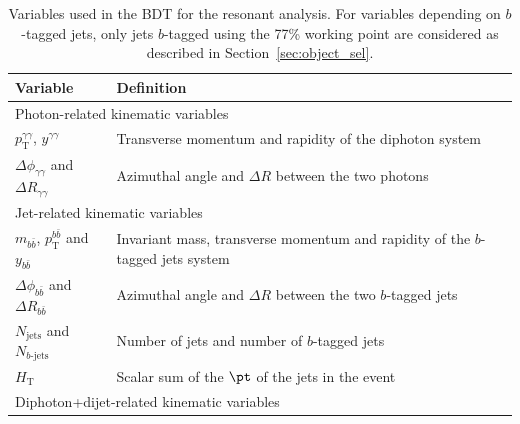 \documentclass[PAPER, cernpreprint, texlive=2016, paper=a4, USenglish, texmf]{atlasdoc}
\begin{document}
\begin{table}[!htb]
\centering
\renewcommand{\arraystretch}{.8}
\caption{Variables used in the BDT for the resonant analysis.
For variables depending on $b$-tagged jets, only jets $b$-tagged using the 77\% working point are considered as described in Section~\ref{sec:object_sel}.   \label{tab:BDT_Res_input}}
\begin{tabular}{ll}
\toprule
\midrule
Variable & Definition  \\
\midrule
\midrule
\multicolumn{2}{l}{Photon-related kinematic variables} \\
\midrule
$p_{\mathrm{T}}^{\gamma \gamma}$, $y^{\gamma \gamma}$  & \begin{minipage}[l]{0.55\textwidth} Transverse momentum and rapidity of the diphoton system  \end{minipage} \\[2ex]
$\Delta \phi_{\gamma \gamma}$ and $\Delta R_{\gamma \gamma}$  & \begin{minipage}[l]{0.55\textwidth} Azimuthal angle and $\Delta R$ between the two photons  \end{minipage} \\[2ex]
\midrule
\midrule
\multicolumn{2}{l}{Jet-related kinematic variables} \\
\midrule
$m_{b \bar{b}}$, $p_{\mathrm{T}}^{b \bar{b}}$ and $y_{b \bar{b}}$  & \begin{minipage}[l]{0.55\textwidth} Invariant mass, transverse momentum and rapidity of the $b$-tagged jets system  \end{minipage} \\[2.5ex]
$\Delta \phi_{b \bar{b}}$  and $\Delta R_{b \bar{b}}$  & \begin{minipage}[l]{0.55\textwidth} Azimuthal angle and $\Delta R$ between the two $b$-tagged jets  \end{minipage} \\[2.5ex]
$N_{\text{jets}}$ and $N_{b\text{-jets}}$   & \begin{minipage}[l]{0.55\textwidth} Number of jets  and number of $b$-tagged jets\end{minipage} \\[2ex]
$H_{\text{T}}$ & \begin{minipage}[l]{0.55\textwidth} Scalar sum of the $\pt$ of the jets in the event \end{minipage}  \\[2ex]
\midrule
\midrule
\multicolumn{2}{l}{Diphoton+dijet-related kinematic variables} \\

\end{tabular}
\end{table}
\end{document}
